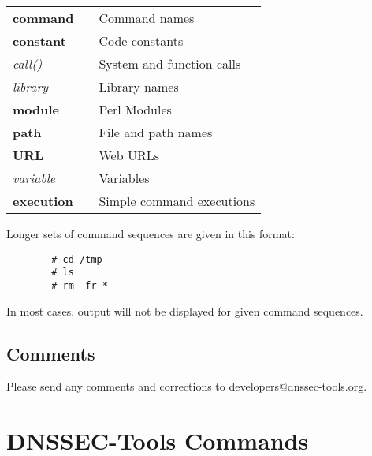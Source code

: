 \documentclass[12pt]{article}
\newcommand{\cmd}[1]{{\bf #1}}
\newcommand{\const}[1]{{\bf #1}}
\newcommand{\func}[1]{{\em #1}}
\newcommand{\lib}[1]{{\em #1}}
\newcommand{\perlmod}[1]{{\bf #1}}
\newcommand{\path}[1]{{\bf #1}}
\newcommand{\url}[1]{{\bf #1}}
\newcommand{\var}[1]{{\em #1}}
\newcommand{\xqt}[1]{{\bf #1}}
\begin{document}
\begin{table}[hb]
\begin{tabular}{lll}
\cmd{command}		& & Command names\\
\const{constant}	& & Code constants\\
\func{call()}		& & System and function calls\\
\lib{library}		& & Library names\\
\perlmod{module}	& & Perl Modules\\
\path{path}		& & File and path names\\
\url{URL}		& & Web URLs\\
\var{variable}		& & Variables\\
\xqt{execution}		& & Simple command executions\\
\end{tabular}
\end{table}

Longer sets of command sequences are given in this format:
\begin{verbatim}
        # cd /tmp
        # ls
        # rm -fr *
\end{verbatim}
In most cases, output will not be displayed for given command sequences.

\vspace{.25in}

\subsection{\bf Comments}

Please send any comments and corrections to developers@dnssec-tools.org.


\clearpage

\section{DNSSEC-Tools Commands}
\label{sect-commands}




\clearpage
\end{document}
